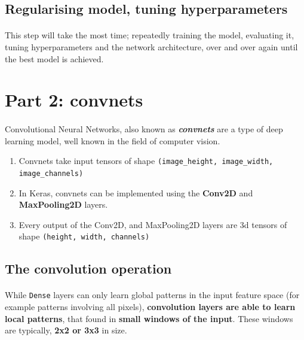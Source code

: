 \documentclass[12pt, a4paper]{article}
\begin{document}
\subsection{Regularising model, tuning hyperparameters}
\paragraph*{}
This step will take the most time; repeatedly training the model, evaluating it,
tuning hyperparameters and the network architecture, over and over again until 
the best model is achieved.


\newpage

\section{Part 2: convnets}
\paragraph*{}
Convolutional Neural Networks, also known as \textbf{\textit{convnets}} are 
a type of deep learning model, well known in the field of computer vision.

\begin{enumerate}
   \item Convnets take input tensors of shape \lstinline{(image_height, image_width, image_channels)}
   \item In Keras, convnets can be implemented using
   the \textbf{Conv2D} and \textbf{MaxPooling2D} layers.
   \item Every output of the Conv2D, and MaxPooling2D layers are 3d tensors 
   of shape \lstinline{(height, width, channels)}
\end{enumerate}

\subsection{The convolution operation}
\paragraph*{}
While \lstinline{Dense} layers can only learn global patterns in the 
input feature space (for example patterns involving all pixels),
\textbf{convolution layers are able to learn local patterns}, that found 
in \textbf{small windows of the input}. These windows are typically,
\textbf{2x2 or 3x3} in size.
\end{document}

